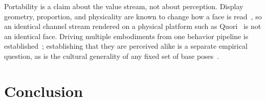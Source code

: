 \documentclass[conference]{IEEEtran}
\begin{document}
%
Portability is a claim about the value stream, not about perception.
Display geometry, proportion, and physicality are known to change how a face
is read~\cite{broadbent2013screenface,longface2026}, so an identical channel
stream rendered on a physical platform such as Quori~\cite{specian2021quori}
is not an identical face. Driving multiple embodiments from one behavior
pipeline is established~\cite{hartholt2019vhtoolkit}; establishing that they
are perceived alike is a separate empirical question, as is the cultural
generality of any fixed set of base poses~\cite{chen2019culturalexpr}.


\section{Conclusion}
\end{document}
